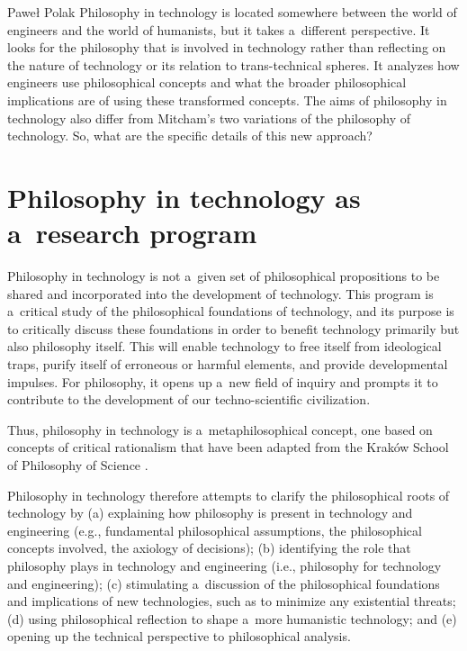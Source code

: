 \begin{artengenv}{Paweł Polak}
Philosophy in technology is located somewhere between the world of engineers and the world of humanists, but it takes a~different perspective. It looks for the philosophy that is involved in technology rather than reflecting on the nature of technology or its relation to trans-technical spheres. It analyzes how engineers use philosophical concepts and what the broader philosophical implications are of using these transformed concepts. The aims of philosophy in technology also differ from Mitcham's two variations of the philosophy of technology. So, what are the specific details of this new approach?



\section{Philosophy in technology as a~research program}

Philosophy in technology is not a~given set of philosophical propositions to be shared and incorporated into the development of technology. This program is a~critical study of the philosophical foundations of technology, and its purpose is to critically discuss these foundations in order to benefit technology primarily but also philosophy itself. This will enable technology to free itself from ideological traps, purify itself of erroneous or harmful elements, and provide developmental impulses. For philosophy, it opens up a~new field of inquiry and prompts it to contribute to the development of our techno-scientific civilization.



Thus, philosophy in technology is a~metaphilosophical concept, one based on concepts of critical rationalism that have been adapted from the Kraków School of Philosophy of Science 
\parencite[][]{polak_krakow_2022}.%




Philosophy in technology therefore attempts to clarify the philosophical roots of technology by (a) explaining how philosophy is present in technology and engineering (e.g., fundamental philosophical assumptions, the philosophical concepts involved, the axiology of decisions); (b) identifying the role that philosophy plays in technology and engineering (i.e., philosophy for technology and engineering); (c) stimulating a~discussion of the philosophical foundations and implications of new technologies, such as to minimize any existential threats; (d) using philosophical reflection to shape a~more humanistic technology; and (e) opening up the technical perspective to philosophical analysis.




\end{artengenv}
